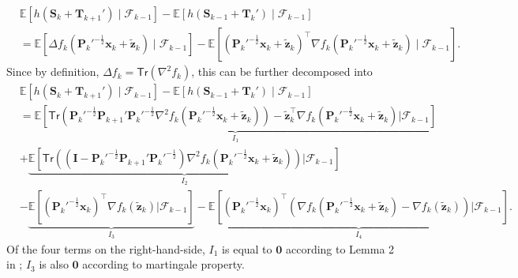 \begin{align*}
&\mathbb{E}\left[h(\bm{S}_k + \bm{T}_{k+1}')\mid \mathscr{F}_{k-1}\right] - \mathbb{E}[h(\bm{S}_{k-1} + \bm{T}_k')\mid \mathscr{F}_{k-1}]\\ 
&=\mathbb{E}[\Delta f_k(\bm{P}_k'^{-\frac{1}{2}}\bm{x}_k + \tilde{\bm{z}}_k)\mid \mathscr{F}_{k-1}]- \mathbb{E}\left[(\bm{P}_k'^{-\frac{1}{2}}\bm{x}_k + \tilde{\bm{z}}_k)^\top \nabla f_k(\bm{P}_k'^{-\frac{1}{2}}\bm{x}_k + \tilde{\bm{z}}_k)\mid \mathscr{F}_{k-1}\right].
\end{align*}
Since by definition, $\Delta f_k = \mathsf{Tr}(\nabla^2 f_k)$, this can be further decomposed into
\begin{align}\label{eq:srikant-decompose}
&\mathbb{E}\left[h(\bm{S}_k + \bm{T}_{k+1}')\mid \mathscr{F}_{k-1}\right] - \mathbb{E}[h(\bm{S}_{k-1} + \bm{T}_k')\mid \mathscr{F}_{k-1}]\nonumber \\ 
&= \underset{I_1}{\underbrace{\mathbb{E}\left[\mathsf{Tr}\left(\bm{P}_k'^{-\frac{1}{2}}\bm{P}_{k+1}'\bm{P}_k'^{-\frac{1}{2}}\nabla^2 f_k(\bm{P}_k'^{-\frac{1}{2}}\bm{x}_k + \tilde{\bm{z}}_k)\right)-\tilde{\bm{z}}_k^\top \nabla f_k(\bm{P}_k'^{-\frac{1}{2}}\bm{x}_k + \tilde{\bm{z}}_k) \bigg| \mathscr{F}_{k-1}\right]}} \nonumber \\ 
&+ \underset{I_2}{\underbrace{\mathbb{E}\left[\mathsf{Tr}\left(\left(\bm{I}-\bm{P}_k'^{-\frac{1}{2}}\bm{P}_{k+1}'\bm{P}_k'^{-\frac{1}{2}}\right)\nabla^2 f_k(\bm{P}_k'^{-\frac{1}{2}}\bm{x}_k + \tilde{\bm{z}}_k)\right)\bigg|\mathscr{F}_{k-1}\right]}} \nonumber \\ 
&- \underset{I_3}{\underbrace{\mathbb{E}\left[(\bm{P}_k'^{-\frac{1}{2}}\bm{x}_k)^\top \nabla f_k(\tilde{\bm{z}}_k) \bigg|\mathscr{F}_{k-1}\right]}} - \underset{I_4}{\underbrace{\mathbb{E}\left[(\bm{P}_k'^{-\frac{1}{2}}\bm{x}_k)^\top \left(\nabla f_k(\bm{P}_k'^{-\frac{1}{2}}\bm{x}_k + \tilde{\bm{z}}_k)- \nabla f_k(\tilde{\bm{z}}_k) \right)\bigg|\mathscr{F}_{k-1}\right]}}.
\end{align}
Of the four terms on the right-hand-side, $I_1$ is equal to $\bm{0}$ according to Lemma 2 in \cite{srikant2024rates}; $I_3$ is also $\bm{0}$ according to martingale property. 

